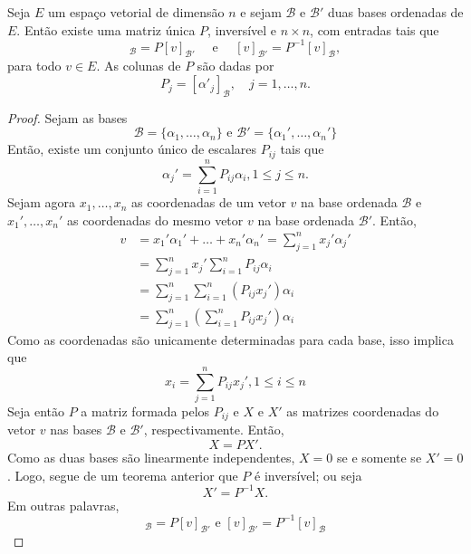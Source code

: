 \begin{teo}
	Seja $E$ um espaço vetorial de dimensão $n$ e sejam ${\mathcal{B}}$ e ${\mathcal{B}}'$ duas bases ordenadas de $E$. Então existe uma matriz única $P$, inversível e $n\times n$, com entradas tais que
    \begin{equation*}
    	[v]_{\mathcal{B}} = P[v]_{{\mathcal{B}}'} \quad \mbox{ e } \quad [v]_{{\mathcal{B}}'}=P^{-1}[v]_{\mathcal{B}},
    \end{equation*}
    para todo $v\in E$. As colunas de $P$ são dadas por 
    \begin{equation*}
    	P_j = [\alpha'_j]_{\mathcal{B}}, \quad j = 1,\ldots,n.
    \end{equation*}
\end{teo}
\begin{proof}
Sejam as bases
\begin{equation*}
   {\mathcal{B}} = \{\alpha_1,\ldots,\alpha_n\} \mbox{ e } {\mathcal{B}}' = \{ \alpha_1',\ldots,\alpha_n'\}
\end{equation*}
Então, existe um conjunto único de escalares $P_{ij}$ tais que
\begin{equation*}
   \alpha_j' = \sum_{i=1}^n P_{ij} \alpha_i, 1\leq j\leq n.
\end{equation*}
Sejam agora $x_1,\ldots,x_n$ as coordenadas de um vetor $v$ na base ordenada ${\mathcal{B}}$ e $x_1',\ldots,x_n'$ as coordenadas do mesmo vetor $v$ na base ordenada ${\mathcal{B}}'$. Então,
\begin{align*}
  v &= x_1'\alpha_1'+\ldots + x_n'\alpha_n' = \sum_{j=1}^n x_j'\alpha_j'\\
  &= \sum_{j=1}^nx_j'\sum_{i=1}^n P_{ij}\alpha_i\\
  &= \sum_{j=1}^n\sum_{i=1}^n (P_{ij}x_j')\alpha_i\\
  &= \sum_{j=1}^n\left(\sum_{i=1}^n P_{ij}x_j'\right)\alpha_i
\end{align*}
Como as coordenadas são unicamente determinadas para cada base, isso implica que
\begin{equation*}
   x_i = \sum_{j=1}^n P_{ij} x_j', 1\leq i\leq n
\end{equation*}
Seja então $P$ a matriz formada pelos $P_{ij}$ e $X$ e $X'$ as matrizes coordenadas do vetor $v$ nas bases ${\mathcal{B}}$ e ${\mathcal{B}}'$, respectivamente. Então,
\begin{equation*}
   X = PX'.
\end{equation*}
Como as duas bases são linearmente independentes, $X=0$ se e somente se $X'=0$. Logo, segue de um teorema anterior que $P$ é inversível; ou seja
\begin{equation*}
   X' = P^{-1}X.
\end{equation*}
Em outras palavras,
\begin{equation*}
   [v]_{\mathcal{B}} = P[v]_{{\mathcal{B}}'} \mbox{ e } [v]_{{\mathcal{B}}'} = P^{-1}[v]_{\mathcal{B}}
\end{equation*}
\end{proof}

